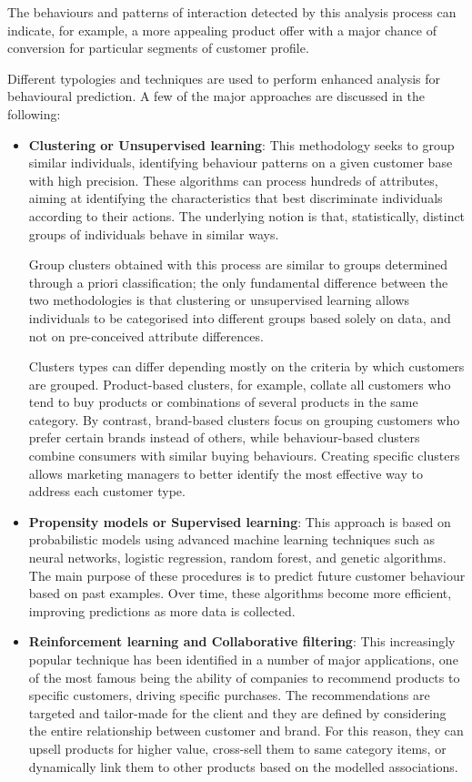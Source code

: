 The behaviours and patterns of interaction detected by this analysis process can indicate, for example, a more appealing product offer with a major chance of conversion for particular segments of customer profile.

Different typologies and techniques are used to perform enhanced analysis for behavioural prediction. A few of the major approaches are discussed in the following:

\begin{itemize}
    \item \textbf{Clustering or Unsupervised learning}: This methodology seeks to group similar individuals, identifying behaviour patterns on a given customer base with high precision. These algorithms can process hundreds of attributes, aiming at identifying the characteristics that best discriminate individuals according to their actions. The underlying notion is that, statistically, distinct groups of individuals behave in similar ways. 
    
    Group clusters obtained with this process are similar to groups determined through a priori classification; the only fundamental difference between the two methodologies is that clustering or unsupervised learning allows individuals to be categorised into different groups based solely on data, and not on pre-conceived attribute differences. 
    
    Clusters types can differ depending mostly on the criteria by which customers are grouped. Product-based clusters, for example, collate all customers who tend to buy products or combinations of several products in the same category. By contrast, brand-based clusters focus on grouping customers who prefer certain brands instead of others, while behaviour-based clusters combine consumers with similar buying behaviours. Creating specific clusters allows marketing managers to better identify the most effective way to address each customer type.

    \item \textbf{Propensity models or Supervised learning}: This approach is based on probabilistic models using advanced machine learning techniques such as neural networks, logistic regression, random forest, and genetic algorithms. The main purpose of these procedures is to predict future customer behaviour based on past examples. Over time, these algorithms become more efficient, improving predictions as more data is collected.

    \item \textbf{Reinforcement learning and Collaborative filtering}: This increasingly popular technique has been identified in a number of major applications, one of the most famous being the ability of companies to recommend products to specific customers, driving specific purchases. The recommendations are targeted and tailor-made for the client and they are defined by considering the entire relationship between customer and brand. For this reason, they can upsell products for higher value, cross-sell them to same category items, or dynamically link them to other products based on the modelled associations.
  \end{itemize} 

